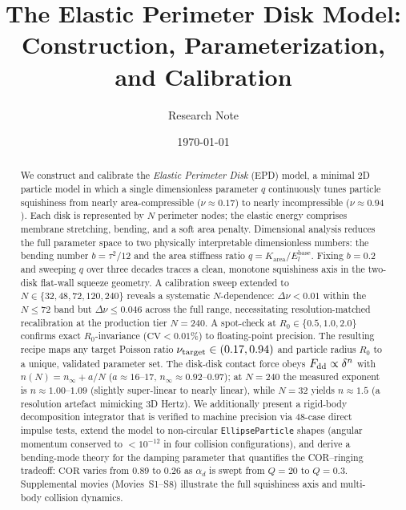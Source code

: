 \documentclass[aps,pre,twocolumn,floatfix,longbibliography]{revtex4-2}
\newcommand{\Elb}{E_l^{\mathrm{base}}}
\newcommand{\Karea}{K_{\mathrm{area}}}
\newcommand{\cv}{\mathrm{CV}}
\begin{document}
\title{The Elastic Perimeter Disk Model:\\
       Construction, Parameterization, and Calibration}

\author{Research Note}
\date{\today}

\begin{abstract}
We construct and calibrate the \emph{Elastic Perimeter Disk} (EPD) model, a minimal
2D particle model in which a single dimensionless parameter $q$ continuously tunes
particle squishiness from nearly area-compressible ($\nu \approx 0.17$) to nearly
incompressible ($\nu \approx 0.94$).  Each disk is represented by $N$ perimeter
nodes; the elastic energy comprises membrane stretching, bending, and a soft area
penalty.  Dimensional analysis reduces the full parameter space to two physically
interpretable dimensionless numbers: the bending number $b = \tau^2/12$ and the area
stiffness ratio $q = \Karea/\Elb$.  Fixing $b = 0.2$ and sweeping $q$ over three
decades traces a clean, monotone squishiness axis in the two-disk flat-wall squeeze
geometry.  A calibration sweep extended to $N \in \{32, 48, 72, 120, 240\}$ reveals a
systematic $N$-dependence: $\Delta\nu < 0.01$ within the $N \leq 72$ band but
$\Delta\nu \leq 0.046$ across the full range, necessitating resolution-matched
recalibration at the production tier $N = 240$.  A spot-check at $R_0 \in \{0.5, 1.0, 2.0\}$
confirms exact $R_0$-invariance ($\cv < 0.01\%$) to floating-point precision.  The
resulting recipe maps any target Poisson ratio $\nu_{\rm target} \in (0.17, 0.94)$
and particle radius $R_0$ to a unique, validated parameter set.  The disk-disk
contact force obeys $F_{\rm dd} \propto \delta^n$ with $n(N) = n_\infty + a/N$
($a \approx 16$--$17$, $n_\infty \approx 0.92$--$0.97$); at $N = 240$ the measured
exponent is $n \approx 1.00$--$1.09$ (slightly super-linear to nearly linear), while $N = 32$ yields
$n \approx 1.5$ (a resolution artefact mimicking 3D Hertz).  We additionally
present a rigid-body decomposition integrator that is verified to machine precision
via 48-case direct impulse tests, extend the model to non-circular
\texttt{EllipseParticle} shapes (angular momentum conserved to $< 10^{-12}$ in four
collision configurations), and derive a bending-mode theory for the damping parameter
that quantifies the COR--ringing tradeoff: $\text{COR}$ varies from 0.89 to 0.26
as $\alpha_d$ is swept from $Q = 20$ to $Q = 0.3$.
Supplemental movies (Movies~S1--S8) illustrate the full squishiness axis and
multi-body collision dynamics.
\end{abstract}
\end{document}
